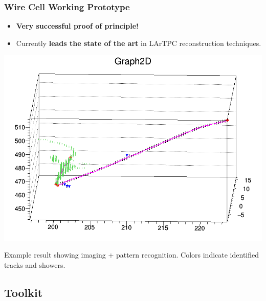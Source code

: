 \begin{frame}
  \frametitle{Wire Cell Working Prototype}
  \footnotesize

  \begin{itemize}
  \item \textbf{Very successful proof of principle!}
  \item Currently \textbf{leads the state of the art} in LArTPC
    reconstruction techniques.
  \end{itemize}

  \begin{center}
    \includegraphics[height=0.5\textheight,trim=0cm 0cm 0cm 2cm,clip]{xin-shower.png}

    \scriptsize
    Example result showing imaging + pattern recognition.  Colors indicate identified tracks and showers.
  \end{center}

\end{frame}

\subsection{Toolkit}

